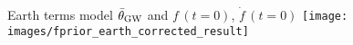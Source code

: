 \documentclass[10pt]{beamer}
\begin{document}
\begin{frame}{Earth terms model $\bar{\theta}_{\rm GW}$ and $f \, (t=0)$, $\dot{f} \, (t=0)$}
	\texttt{[image: images/fprior\_earth\_corrected\_result]}
\end{frame}





	
\end{document}
